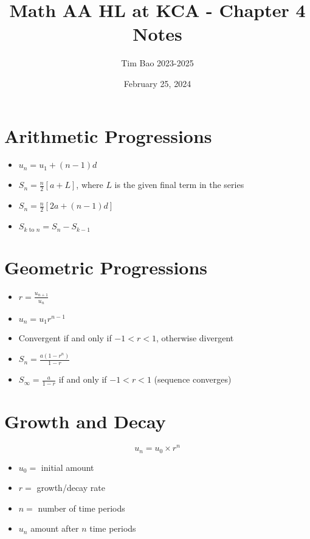 \documentclass[11pt]{article}
\title{Math AA HL at KCA - Chapter 4 Notes}
\author{Tim Bao 2023-2025}
\date{February 25, 2024}
\begin{document}
\maketitle
\pagebreak

\section{Arithmetic Progressions}

\begin{itemize}
  \setlength\itemsep{1em}
  \item $u_n = u_1 + (n - 1)d$
  \item $S_n = \frac{n}{2}\left[a + L\right]$, where $L$ is the given final term in the series
  \item $S_n = \frac{n}{2}\left[2a + (n - 1)d\right]$
  \item $S_{k \text{ to } n} = S_{n} - S_{k - 1}$
\end{itemize}

\section{Geometric Progressions}

\begin{itemize}
  \setlength\itemsep{1em}
  \item $r = \frac{u_{n + 1}}{u_n}$
  \item $u_n = u_1r^{n - 1}$
  \item Convergent if and only if $-1 < r < 1$, otherwise divergent
  \item $S_n = \frac{a(1 - r^n)}{1 - r}$
  \item $S_\infty = \frac{a}{1 - r}$ if and only if $-1 < r < 1$ (sequence converges)
\end{itemize}

\section{Growth and Decay}

$$u_n = u_0 \times r^n$$

\begin{itemize}
  \item $u_0 = $ initial amount
  \item $r = $ growth/decay rate
  \item $n = $ number of time periods
  \item $u_n$ amount after $n$ time periods
\end{itemize}
\end{document}

